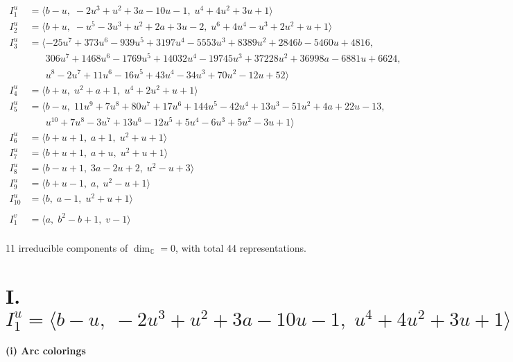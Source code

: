 \documentclass[1p]{elsarticle_modified}
\theoremstyle{definition}
\begin{document}
\begin{align*}
I^u_{1}&=\langle 
b- u,\;-2 u^3+u^2+3 a-10 u-1,\;u^4+4 u^2+3 u+1\rangle \\
I^u_{2}&=\langle 
b+u,\;- u^5-3 u^3+u^2+2 a+3 u-2,\;u^6+4 u^4- u^3+2 u^2+u+1\rangle \\
I^u_{3}&=\langle 
-25 u^7+373 u^6-939 u^5+3197 u^4-5553 u^3+8389 u^2+2846 b-5460 u+4816,\\
\phantom{I^u_{3}}&\phantom{= \langle  }306 u^7+1468 u^6-1769 u^5+14032 u^4-19745 u^3+37228 u^2+36998 a-6881 u+6624,\\
\phantom{I^u_{3}}&\phantom{= \langle  }u^8-2 u^7+11 u^6-16 u^5+43 u^4-34 u^3+70 u^2-12 u+52\rangle \\
I^u_{4}&=\langle 
b+u,\;u^2+a+1,\;u^4+2 u^2+u+1\rangle \\
I^u_{5}&=\langle 
b- u,\;11 u^9+7 u^8+80 u^7+17 u^6+144 u^5-42 u^4+13 u^3-51 u^2+4 a+22 u-13,\\
\phantom{I^u_{5}}&\phantom{= \langle  }u^{10}+7 u^8-3 u^7+13 u^6-12 u^5+5 u^4-6 u^3+5 u^2-3 u+1\rangle \\
I^u_{6}&=\langle 
b+u+1,\;a+1,\;u^2+u+1\rangle \\
I^u_{7}&=\langle 
b+u+1,\;a+u,\;u^2+u+1\rangle \\
I^u_{8}&=\langle 
b- u+1,\;3 a-2 u+2,\;u^2- u+3\rangle \\
I^u_{9}&=\langle 
b+u-1,\;a,\;u^2- u+1\rangle \\
I^u_{10}&=\langle 
b,\;a-1,\;u^2+u+1\rangle \\
\\
I^v_{1}&=\langle 
a,\;b^2- b+1,\;v-1\rangle \\
\end{align*}
\raggedright * 11 irreducible components of $\dim_{\mathbb{C}}=0$, with total 44 representations.\\
\newpage
\renewcommand{\arraystretch}{1}
\centering \section*{I. $I^u_{1}= \langle b- u,\;-2 u^3+u^2+3 a-10 u-1,\;u^4+4 u^2+3 u+1 \rangle$}
\flushleft \textbf{(i) Arc colorings}\\
\end{document}
